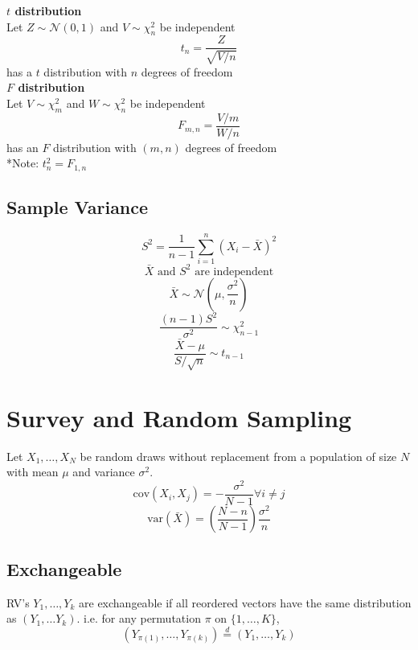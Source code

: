 \documentclass{article}
\begin{document}
\begin{multicols}{2}
\textbf{$t$ distribution}\\
Let $Z \sim \mathcal{N}(0,1)$ and $V \sim \chi^2_n$ be independent
$$t_n = \frac{Z}{\sqrt{V/n}}$$ has a $t$ distribution with $n$ degrees of freedom\\

\textbf{$F$ distribution}\\
Let $V \sim \chi_m^2$ and $W \sim \chi^2_n$ be independent
$$F_{m,n} = \frac{V/m}{W/n}$$ has an $F$ distribution with $(m,n)$ degrees of freedom\\
*Note: $t_n^2 = F_{1,n}$

\subsection{Sample Variance}
$$S^2 = \frac{1}{n-1}\sum_{i=1}^{n}(X_i-\bar{X})^2$$
$$\bar{X} \text{ and } S^2 \text{ are independent}$$
$$\bar{X} \sim \mathcal{N}\left(\mu,\frac{\sigma^2}{n}\right)$$
$$\frac{(n-1)S^2}{\sigma^2}\sim \chi^2_{n-1}$$
$$\frac{\bar{X}-\mu}{S/\sqrt{n}} \sim t_{n-1}$$
\section{Survey and Random Sampling}
Let $X_1, \dots, X_N$ be random draws without replacement from a population of size $N$ with mean $\mu$ and variance $\sigma^2$.
$$\text{cov}(X_i, X_j) = -\frac{\sigma^2}{N-1} \forall i\neq j$$
$$\text{var}(\bar{X}) = \left(\frac{N-n}{N-1}\right)\frac{\sigma^2}{n}$$

\subsection{Exchangeable}
RV's $Y_1, \dots, Y_k$ are exchangeable if all reordered vectors have the same distribution as $(Y_1, \dots Y_k)$. i.e. for any permutation $\pi$ on $\{1,\dots,K\}$,
$$(Y_{\pi(1)}, \dots, Y_{\pi(k)}) \stackrel{d}{=}(Y_{1}, \dots, Y_{k})$$

\end{multicols}
\end{document}
